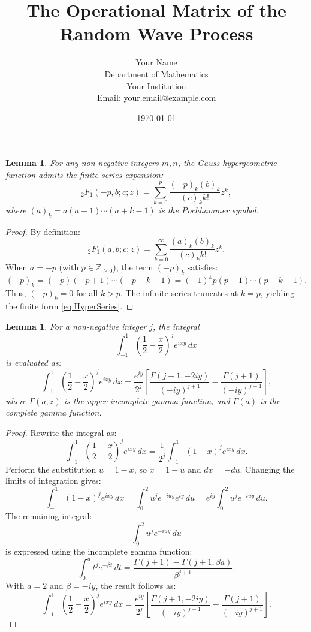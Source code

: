 \documentclass[12pt]{article}
\title{The Operational Matrix of the Random Wave Process}
\author{Your Name \\ Department of Mathematics \\ Your Institution \\ Email: your.email@example.com}
\date{\today}
\newtheorem{lemma}[theorem]{Lemma}
\begin{document}
\maketitle

\begin{lemma}\label{lem:HyperExpansions}
For any non-negative integers $m, n$, the Gauss hypergeometric function admits the finite series expansion:
\begin{equation}\label{eq:HyperSeries}
{}_2F_1(-p, b; c; z) = \sum_{k=0}^p \frac{(-p)_k (b)_k}{(c)_k k!} z^k,
\end{equation}
where $(a)_k = a(a+1)\cdots(a+k-1)$ is the Pochhammer symbol.
\end{lemma}

\begin{proof}
By definition:
\[
{}_2F_1(a, b; c; z) = \sum_{k=0}^\infty \frac{(a)_k (b)_k}{(c)_k k!} z^k.
\]
When $a = -p$ (with \( p \in \mathbb{Z}_{\geq 0} \)), the term $(-p)_k$ satisfies:
\[
(-p)_k = (-p)(-p+1)\cdots(-p+k-1) = (-1)^k p(p-1)\cdots(p-k+1).
\]
Thus, $(-p)_k = 0$ for all $k > p$. The infinite series truncates at $k = p$, yielding the finite form \eqref{eq:HyperSeries}.
\end{proof}

\begin{lemma}\label{lem:IntegralGamma}
For a non-negative integer $j$, the integral
\[
\int_{-1}^1 \left(\frac{1}{2} - \frac{x}{2}\right)^j e^{i x y} \, dx
\]
is evaluated as:
\begin{equation}\label{eq:IntegralGamma}
\int_{-1}^1 \left(\frac{1}{2} - \frac{x}{2}\right)^j e^{i x y} \, dx = 
\frac{e^{iy}}{2^j} \left[\frac{\Gamma(j+1, -2iy)}{(-iy)^{j+1}} - \frac{\Gamma(j+1)}{(-iy)^{j+1}}\right],
\end{equation}
where $\Gamma(a, z)$ is the upper incomplete gamma function, and $\Gamma(a)$ is the complete gamma function.
\end{lemma}

\begin{proof}
Rewrite the integral as:
\[
\int_{-1}^1 \left(\frac{1}{2} - \frac{x}{2}\right)^j e^{i x y} \, dx = \frac{1}{2^j} \int_{-1}^1 (1-x)^j e^{i x y} \, dx.
\]
Perform the substitution $u = 1 - x$, so $x = 1 - u$ and $dx = -du$. Changing the limits of integration gives:
\[
\int_{-1}^1 (1-x)^j e^{i x y} \, dx = \int_0^2 u^j e^{-i u y} e^{i y} \, du = e^{i y} \int_0^2 u^j e^{-i u y} \, du.
\]
The remaining integral:
\[
\int_0^2 u^j e^{-i u y} \, du
\]
is expressed using the incomplete gamma function:
\[
\int_0^a t^j e^{-\beta t} \, dt = \frac{\Gamma(j+1) - \Gamma(j+1, \beta a)}{\beta^{j+1}}.
\]
With $a = 2$ and $\beta = -iy$, the result follows as:
\[
\int_{-1}^1 \left(\frac{1}{2} - \frac{x}{2}\right)^j e^{i x y} \, dx = \frac{e^{iy}}{2^j} \left[\frac{\Gamma(j+1, -2iy)}{(-iy)^{j+1}} - \frac{\Gamma(j+1)}{(-iy)^{j+1}}\right].
\]
\end{proof}
\end{document}
